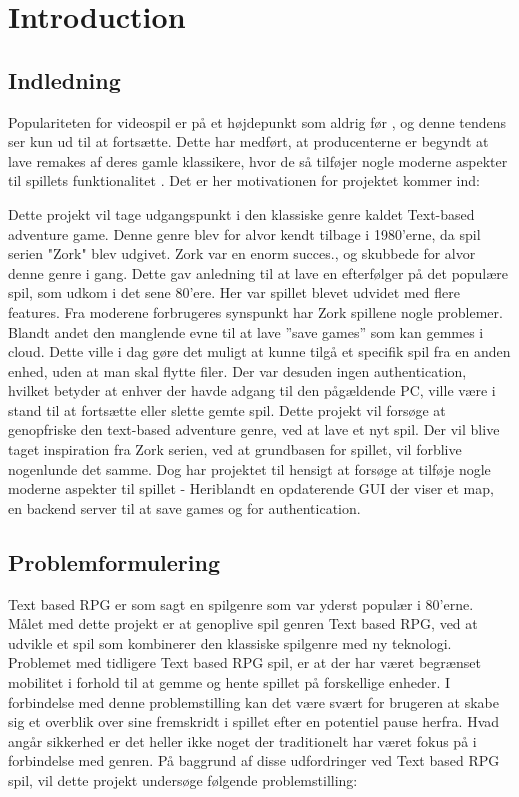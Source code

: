 \section{Introduction}
\subsection{Indledning}

Populariteten for videospil er på et højdepunkt som aldrig før \cite{REFERENCE}, og denne tendens ser kun ud til at fortsætte. Dette har medført, at producenterne er begyndt at lave remakes af deres gamle klassikere, hvor de så tilføjer nogle moderne aspekter til spillets funktionalitet \cite{REFERENCE}. Det er her motivationen for projektet kommer ind:

Dette projekt vil tage udgangspunkt i den klassiske genre kaldet Text-based adventure game. Denne genre blev for alvor kendt tilbage i 1980'erne, da spil serien "Zork" blev udgivet. Zork var en enorm succes\cite{REFERENCE}., og skubbede for alvor denne genre i gang. 
Dette gav anledning til at lave en efterfølger på det populære spil, som udkom i det sene 80’ere. Her var spillet blevet udvidet med flere features.
Fra moderene forbrugeres synspunkt har Zork spillene nogle problemer. Blandt andet den manglende evne til at lave ”save games” som kan gemmes i cloud. Dette ville i dag gøre det muligt at kunne tilgå et specifik spil fra en anden enhed, uden at man skal flytte filer. Der var desuden ingen authentication, hvilket betyder at enhver der havde adgang til den pågældende PC, ville være i stand til at fortsætte eller slette gemte spil. 
Dette projekt vil forsøge at genopfriske den text-based adventure genre, ved at lave et nyt spil. Der vil blive taget inspiration fra Zork serien, ved at grundbasen for spillet, vil forblive nogenlunde det samme. Dog har projektet til hensigt at forsøge at tilføje nogle moderne aspekter til spillet - Heriblandt en opdaterende GUI der viser et map, en backend server til at save games og for authentication.




\subsection{Problemformulering}
Text based RPG er som sagt en spilgenre som var yderst populær i 80’erne. Målet med dette projekt er at genoplive spil genren Text based RPG, ved at udvikle et spil som kombinerer den klassiske spilgenre med ny teknologi. Problemet med tidligere Text based RPG spil, er at der har været begrænset mobilitet i forhold til at gemme og hente spillet på forskellige enheder. I forbindelse med denne problemstilling kan det være svært for brugeren at skabe sig et overblik over sine fremskridt i spillet efter en potentiel pause herfra. Hvad angår sikkerhed er det heller ikke noget der traditionelt har været fokus på i forbindelse med genren. På baggrund af disse udfordringer ved Text based RPG spil, vil dette projekt undersøge følgende problemstilling:

